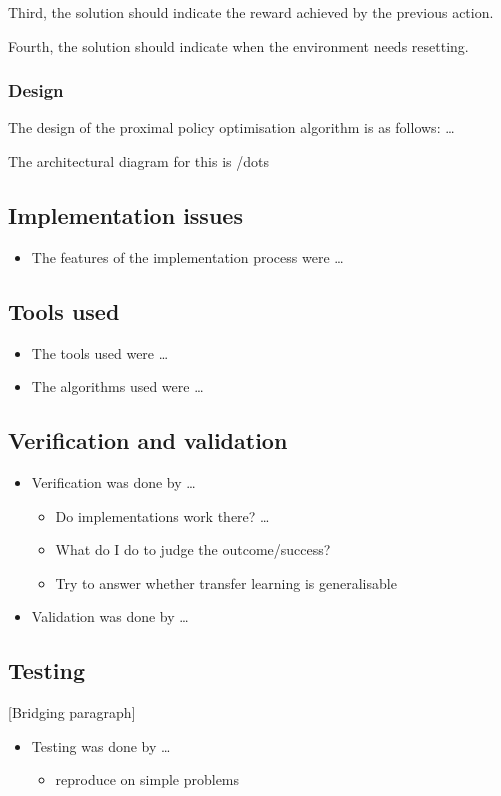 \documentclass[12pt,a4paper]{article}
\begin{document}
Third, the solution should indicate the reward achieved by the previous action.

Fourth, the solution should indicate when the environment needs resetting. 

\subsubsection{Design}
The design of the proximal policy optimisation algorithm is as follows: \dots 

The architectural diagram for this is /dots

\subsection{Implementation issues}
\begin{itemize}
    \item The features of the implementation process were \dots
\end{itemize}

\subsection{Tools used}
\begin{itemize}
    \item The tools used were \dots
    \item The algorithms used were \dots
\end{itemize}

\subsection{Verification and validation}
\begin{itemize}
    \item Verification was done by \dots 
    \begin{itemize}
        \item Do implementations work there? \dots 
        \item What do I do to judge the outcome/success?
        \item Try to answer whether transfer learning is generalisable 
    \end{itemize}
    \item Validation was done by \dots
\end{itemize}

\subsection{Testing}
[Bridging paragraph]
\begin{itemize}
    \item Testing was done by \dots
    \begin{itemize}
        \item reproduce on simple problems
    \end{itemize}
\end{itemize}
\end{document}
